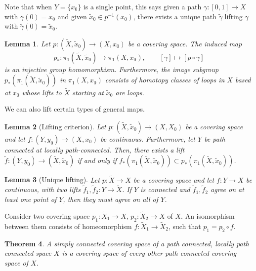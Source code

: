 \documentclass[12pt]{article}
\newtheorem{theorem}{Theorem}[section]
\newtheorem{lemma}[theorem]{Lemma}
\theoremstyle{definition}
\theoremstyle{remark}
\begin{document}
    Note that when $Y = \{x_0\}$ is a single point, this says given a path
    $\gamma\colon [0, 1] \to X$ with $\gamma(0) = x_0$ and given $\tilde{x}_0 \in
    p^{-1}(x_0)$, there exists a unique path $\tilde{\gamma}$ lifting $\gamma$ with
    $\tilde{\gamma}(0) = \tilde{x}_0$. \\


    \begin{lemma}
        Let $p\colon (\tilde{X}, \tilde{x}_0) \to (X, x_0)$ be a covering space. The
        induced map \[
            p_*\colon \pi_1(\tilde{X}, \tilde{x}_0) \to \pi_1(X, x_0), \qquad
            [\gamma] \mapsto [p\circ \gamma]
        \] is an injective group homomorphism. Furthermore, the image subgroup
        $p_*(\pi_1(\tilde{X}, \tilde{x}_0))$ in $\pi_1(X, x_0)$ consists of homotopy
        classes of loops in $X$ based at $x_0$ whose lifts to $\tilde{X}$ starting at
        $\tilde{x}_0$ are loops.
    \end{lemma}

    We can also lift certain types of general maps. \\

    \begin{lemma}[Lifting criterion]
        Let $p\colon (\tilde{X}, \tilde{x}_0) \to (X, X_0)$ be a covering space and
        let $f\colon (Y, y_0) \to (X, x_0)$ be continuous. Furthermore, let $Y$ be
        path connected at locally path-connected. Then, there exists a lift
        $\tilde{f}\colon (Y, y_0) \to (\tilde{X}, \tilde{x}_0)$ if and only if
        $f_*(\pi_1(\tilde{X}, \tilde{x}_0)) \subset p_*(\pi_1(\tilde{X},
        \tilde{x}_0))$.
    \end{lemma}

    \begin{lemma}[Unique lifting]
        Let $p\colon \tilde{X} \to X$ be a covering space and let $f\colon Y \to X$
        be continuous, with two lifts $\tilde{f}_1, \tilde{f}_2\colon Y \to
        \tilde{X}$. If $Y$ is connected and $\tilde{f}_1, \tilde{f}_2$ agree on at
        least one point of $Y$, then they must agree on all of $Y$.
    \end{lemma}

    Consider two covering space $p_1\colon \tilde{X}_1 \to X$, $p_2\colon \tilde{X}_2
    \to X$ of $X$. An isomorphism between them consists of homeomorphism $f\colon
    \tilde{X}_1 \to \tilde{X}_2$, such that $p_1 = p_2\circ f$. \\

    \begin{theorem}
        A simply connected covering space of a path connected, locally path connected
        space $X$ is a covering space of every other path connected covering space of
        $X$.
    \end{theorem}
\end{document}
